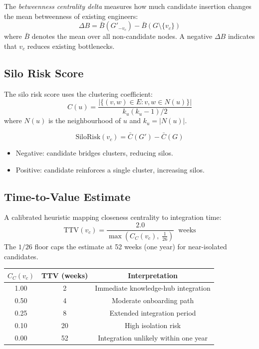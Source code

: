 \documentclass[12pt, a4paper]{article}
\begin{document}
The \emph{betweenness centrality delta} measures how much candidate insertion
changes the mean betweenness of existing engineers:
\[
  \Delta B = \bar{B}(G'_{-v_c}) - \bar{B}(G \setminus \{v_c\})
\]
where $\bar{B}$ denotes the mean over all non-candidate nodes.
A negative $\Delta B$ indicates that $v_c$ reduces existing bottlenecks.

\subsection{Silo Risk Score}

The silo risk score uses the clustering coefficient:
\[
  C(u) = \frac{|\{(v,w) \in E : v, w \in N(u)\}|}{k_u (k_u - 1) / 2}
\]
where $N(u)$ is the neighbourhood of $u$ and $k_u = |N(u)|$.

\[
  \text{SiloRisk}(v_c) = \bar{C}(G') - \bar{C}(G)
\]
\begin{itemize}
  \item Negative: candidate bridges clusters, reducing silos.
  \item Positive: candidate reinforces a single cluster, increasing silos.
\end{itemize}

\subsection{Time-to-Value Estimate}

A calibrated heuristic mapping closeness centrality to integration time:
\[
  \text{TTV}(v_c) = \frac{2.0}{\max\!\left(C_C(v_c),\; \tfrac{1}{26}\right)} \;\; \text{weeks}
\]
The $1/26$ floor caps the estimate at 52 weeks (one year) for near-isolated
candidates.

\begin{center}
\begin{tabular}{ccc}
\toprule
$C_C(v_c)$ & TTV (weeks) & Interpretation \\
\midrule
1.00 & 2  & Immediate knowledge-hub integration \\
0.50 & 4  & Moderate onboarding path \\
0.25 & 8  & Extended integration period \\
0.10 & 20 & High isolation risk \\
0.00 & 52 & Integration unlikely within one year \\
\bottomrule
\end{tabular}
\end{center}
\end{document}
